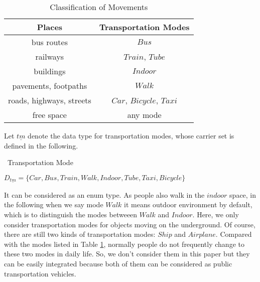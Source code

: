\begin{table}[ht]
 \begin{center}
  \begin{tabular}{c|c}
	\hline
	\textbf{Places}& \textbf{Transportation Modes}\\ 
	\hline
	bus routes& $Bus$\\
	\hline
    railways& $Train$, $Tube$\\
    \hline
	buildings& $Indoor$\\
	\hline
	pavements, footpaths& $Walk$\\	
	\hline
	roads, highways, streets& $Car$, $Bicycle$, $Taxi$\\
	\hline
	free space & any mode\\
	\hline
  \end{tabular}
 \end{center}
 \caption{\label{tab:infrastructure}Classification of Movements}
\end{table}

Let $\underline{tm}$ denote the data type for transportation modes, whose carrier set 
is defined in the following. 
 
\begin{Statement}
\label{tm}
\ Transportation Mode 

$D_{\underline{tm}} =\{Car, Bus, Train, Walk, Indoor, Tube, Taxi, Bicycle\}$

\end{Statement}

It can be considered as an enum type. As people also walk in the $indoor$ space, in the
following when we say mode $Walk$ it means outdoor environment by default, which is to 
distinguish the modes betweeen $Walk$ and $Indoor$. Here, we only consider transportation modes for 
objects moving on the underground. Of course, there are still two kinds of transportation modes: $Ship$ and $Airplane$. Compared with the modes listed in Table \ref{tab:infrastructure}, normally people do not frequently change to these two modes in daily life. So, we don't consider them in this paper but they can be easily integrated because both of them can be considered as public transportation vehicles. 


